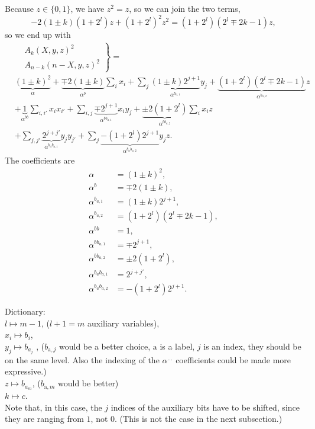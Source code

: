 \documentclass[a4paper,11pt]{article}
\begin{document}
Because $z\in\{0,1\}$, we have $z^2=z$, so we can join the two terms,
\begin{equation}
-2(1\pm k)(1+2^l)z + (1+2^l)^2z^2 = (1+2^l)(2^l\mp2k-1)z,
\end{equation}
so we end up with
\begin{equation}
\label{eq:alpha12}
\begin{split}
&\left.\begin{aligned}
&A_k(X,y,z)^2 \\
&A_{n-k}({n-X},y,z)^2 
\end{aligned}\right\} = \\
&\underbrace{(1\pm k)^2}_{\alpha} 
+ \underbrace{\mp 2(1\pm k)}_{\alpha^{b}} \sum_i x_i 
+ \sum_j \underbrace{(1\pm k)2^{j+1}}_{\alpha^{b_{a,1}}}y_j
+ \underbrace{(1+2^l)(2^l\mp2k-1)}_{\alpha^{b_{a,2}}}z \\
&+ \underbrace{1}_{\alpha^{bb}} \sum_{i,i'} x_ix_{i'} 
+ \sum_{i,j} \underbrace{\mp2^{j+1}}_{\alpha^{bb_{a,1}}}x_iy_j
+ \underbrace{\pm2(1+2^l)}_{\alpha^{bb_{a,2}}}\sum_i x_iz \\
&+ \sum_{j,j'} \underbrace{2^{j+j'}}_{\alpha^{b_ab_{a,1}}}y_jy_{j'}
+ \sum_j \underbrace{-(1+2^l)2^{j+1}}_{\alpha^{b_ab_{a,2}}} y_j z.
\end{split}
\end{equation}
The coefficients are
\begin{subequations}
\label{eq:BCR12alpha}
\begin{align}
\alpha &= (1\pm k)^2, \\
%
\alpha^{b} &= \mp 2(1\pm k), \\
\alpha^{b_{a,1}} &= (1\pm k)2^{j+1}, \\
\alpha^{b_{a,2}} &= (1+2^l)(2^l\mp2k-1), \\
%
\alpha^{bb} &= 1, \\
\alpha^{bb_{a,1}} &= \mp2^{j+1}, \\
\alpha^{bb_{a,2}} &= \pm2(1+2^l), \\
\alpha^{b_ab_{a,1}} &= 2^{j+j'}, \\
\alpha^{b_ab_{a,2}} &= -(1+2^l)2^{j+1}.
\end{align}
\end{subequations}


Dictionary: \\
$l\mapsto m-1$, ($l+1=m$ auxiliary variables),\\
$x_i\mapsto b_i$, \\
$y_j\mapsto b_{a_j}$ ,
($b_{\text{a},j}$ would be a better choice, $\text{a}$ is a label, $j$ is an index, they should be on the same level.
Also the indexing of the $\alpha^{\dots}$ coefficients could be made more expressive.)\\
$z\mapsto b_{a_m}$, ($b_{\text{a},m}$ would be better)\\
$k\mapsto c$.\\
Note that, in this case, the $j$ indices of the auxiliary bits have to be shifted, since they are ranging from $1$, not $0$.
(This is not the case in the next subsection.)
\end{document}
